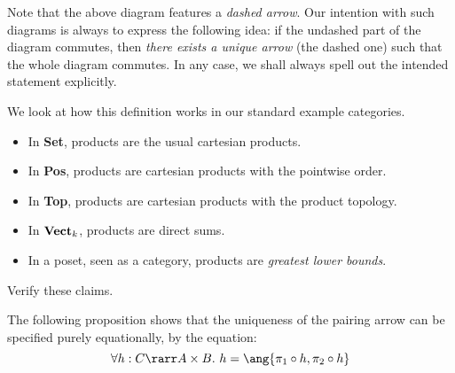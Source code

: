 \documentclass{svmult}
\begin{document}
Note that the above diagram features a \emph{dashed arrow}. Our intention with such diagrams is always to express the following idea: if the undashed part of the diagram commutes, then \emph{there exists a unique arrow} (the dashed one) such that the whole diagram commutes. In any case, we shall always spell out the intended statement explicitly.

We look at how this definition works in our standard example categories.
\begin{itemize}
\item In \textbf{Set}, products are the usual cartesian products.
\item In \textbf{Pos}, products are cartesian products with the pointwise order.
\item In \textbf{Top}, products are cartesian products with the product topology.
\item In $\text{\textbf{Vect}}_k$,  products are direct sums.
\item In a poset, seen as a category, products are \emph{greatest lower bounds}.
\end{itemize}
\begin{myexercise}
Verify these claims.
\end{myexercise}
The following proposition shows that the uniqueness of the pairing arrow can be specified purely equationally, by the equation:
\[ \forall h:C\rarr A\times B.\ h=\ang{\pi_1\circ h,\pi_2\circ h} \]
\end{document}
